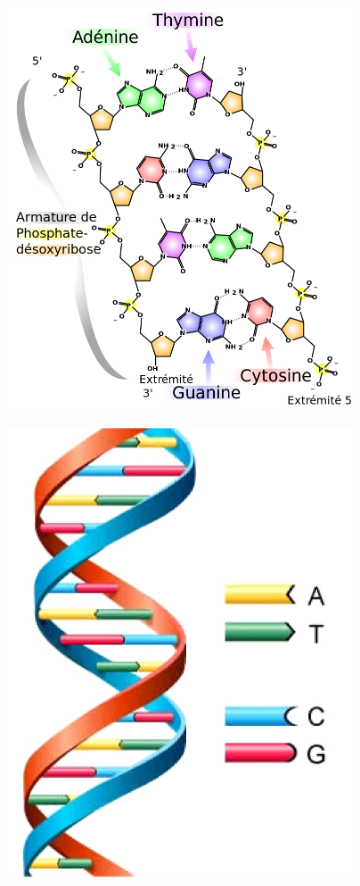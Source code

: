 \begin{figure}
  \begin{subfigure}{.55\textwidth}
  \centering
  {\includegraphics[width=0.7\linewidth]{./figures/ch1/dna_structure}}
    \caption{}
    \label{Fig:dna_structure}
  \end{subfigure}
  \begin{subfigure}{.35\textwidth}
  \centering
  {\includegraphics[width=0.8\linewidth]{./figures/ch1/dna_structure_3d}}

\end{subfigure}
\end{figure}
